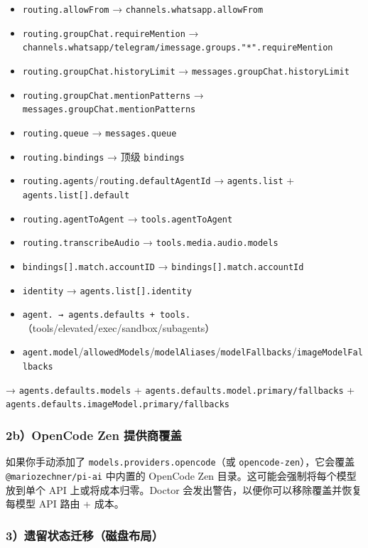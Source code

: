 \begin{itemize}
  \item \texttt{routing.allowFrom} → \texttt{channels.whatsapp.allowFrom}
  \item \texttt{routing.groupChat.requireMention} → \texttt{channels.whatsapp/telegram/imessage.groups."*".requireMention}
  \item \texttt{routing.groupChat.historyLimit} → \texttt{messages.groupChat.historyLimit}
  \item \texttt{routing.groupChat.mentionPatterns} → \texttt{messages.groupChat.mentionPatterns}
  \item \texttt{routing.queue} → \texttt{messages.queue}
  \item \texttt{routing.bindings} → 顶级 \texttt{bindings}
  \item \texttt{routing.agents}/\texttt{routing.defaultAgentId} → \texttt{agents.list} + \texttt{agents.list[].default}
  \item \texttt{routing.agentToAgent} → \texttt{tools.agentToAgent}
  \item \texttt{routing.transcribeAudio} → \texttt{tools.media.audio.models}
  \item \texttt{bindings[].match.accountID} → \texttt{bindings[].match.accountId}
  \item \texttt{identity} → \texttt{agents.list[].identity}
  \item \texttt{agent.\textit{} → \texttt{agents.defaults} + \texttt{tools.}}（tools/elevated/exec/sandbox/subagents）
  \item \texttt{agent.model}/\texttt{allowedModels}/\texttt{modelAliases}/\texttt{modelFallbacks}/\texttt{imageModelFallbacks}
\end{itemize}

→ \texttt{agents.defaults.models} + \texttt{agents.defaults.model.primary/fallbacks} + \texttt{agents.defaults.imageModel.primary/fallbacks}

\subsubsection{2b）OpenCode Zen 提供商覆盖}


如果你手动添加了 \texttt{models.providers.opencode}（或 \texttt{opencode-zen}），它会覆盖 \texttt{@mariozechner/pi-ai} 中内置的 OpenCode Zen 目录。这可能会强制将每个模型放到单个 API 上或将成本归零。Doctor 会发出警告，以便你可以移除覆盖并恢复每模型 API 路由 + 成本。

\subsubsection{3）遗留状态迁移（磁盘布局）}


